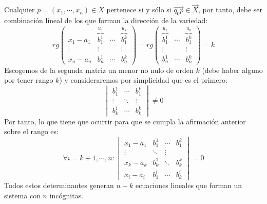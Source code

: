 \documentclass[10pt,a4paper,openright]{book}
\theoremstyle{break}
\begin{document}
Cualquier $p = (x_1, \cdots, x_n) \in X$ pertenece si y sólo si $\vec{q_0 p} \in \vec{X}$, por tanto, debe ser combinación lineal de los que forman la dirección de la variedad:
$$rg\begin{pmatrix} x_1 - a_1 & \overbrace{b_1^1}^{u_1} & \cdots & \overbrace{b_1^k}^{u_k} \\ \vdots & \vdots & & \vdots \\ x_n - a_n & b_n^1 & \cdots & b_n^k \end{pmatrix} = rg \begin{pmatrix} \overbrace{b_1^1}^{u_1} & \cdots & \overbrace{b_1^k}^{u_k} \\ \vdots & & \vdots \\ b_n^1 & \cdots & b_n^k \end{pmatrix}= k$$
Escogemos de la segunda matriz un menor no nulo de orden $k$ (debe haber alguno por tener rango $k$) y consideraremos por simplicidad que es el primero:
$$\begin{vmatrix}
b_1^1 & \cdots & b_1^k \\ \vdots & \ddots & \vdots \\ b_k^1 & \cdots & b_k^k 
\end{vmatrix} \neq 0$$
Por tanto, lo que tiene que ocurrir para que se cumpla la afirmación anterior sobre el rango es:
$$\forall i = k+1, \cdots, n: \begin{vmatrix}
x_1 - a_1 & b_1^1 & \cdots & b_1^k \\ \vdots & \ddots & \vdots \\ x_k - a_k & b_k^1 & \ddots & b_k^k \\ x_i - a_i & b_1^i & \cdots & b_k^i
\end{vmatrix} = 0$$
Todos estos determinantes generan $n-k$ ecuaciones lineales que forman un sistema con $n$ incógnitas.
\end{document}
